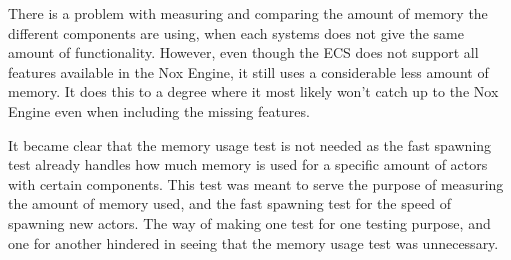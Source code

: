 There is a problem with measuring and comparing the amount of memory the different components are using, when each systems does not give the same amount of functionality.
However, even though the ECS does not support all features available in the Nox Engine, it still uses a considerable less amount of memory.
It does this to a degree where it most likely won't catch up to the Nox Engine even when including the missing features.

It became clear that the memory usage test is not needed as the fast spawning test already handles how much memory is used for a specific amount of actors with certain components.
This test was meant to serve the purpose of measuring the amount of memory used, and the fast spawning test for the speed of spawning new actors.
The way of making one test for one testing purpose, and one for another hindered in seeing that the memory usage test was unnecessary.
